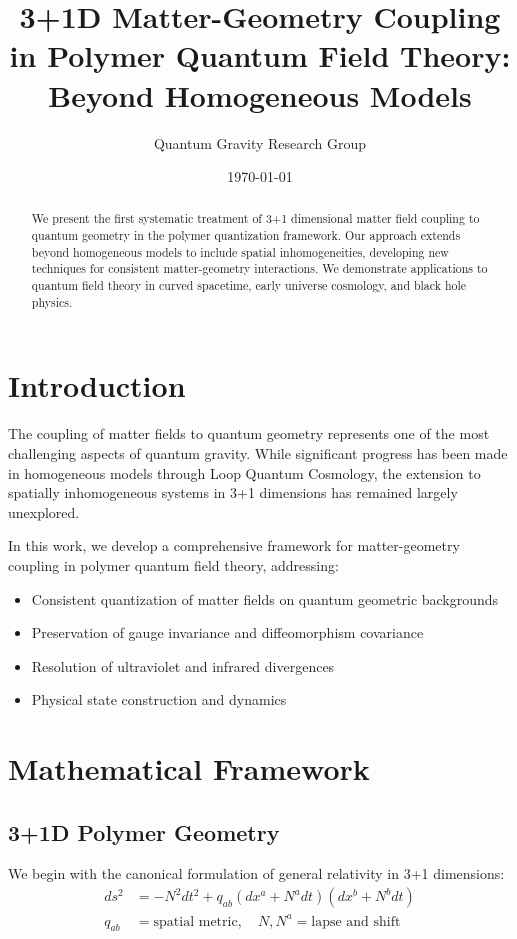\documentclass[11pt]{article}
\title{3+1D Matter-Geometry Coupling in Polymer Quantum Field Theory: Beyond Homogeneous Models}
\author{Quantum Gravity Research Group}
\date{\today}
\begin{document}
\maketitle

\begin{abstract}
We present the first systematic treatment of 3+1 dimensional matter field coupling to quantum geometry in the polymer quantization framework. Our approach extends beyond homogeneous models to include spatial inhomogeneities, developing new techniques for consistent matter-geometry interactions. We demonstrate applications to quantum field theory in curved spacetime, early universe cosmology, and black hole physics.
\end{abstract}

\section{Introduction}

The coupling of matter fields to quantum geometry represents one of the most challenging aspects of quantum gravity. While significant progress has been made in homogeneous models through Loop Quantum Cosmology, the extension to spatially inhomogeneous systems in 3+1 dimensions has remained largely unexplored.

In this work, we develop a comprehensive framework for matter-geometry coupling in polymer quantum field theory, addressing:
\begin{itemize}
\item Consistent quantization of matter fields on quantum geometric backgrounds
\item Preservation of gauge invariance and diffeomorphism covariance
\item Resolution of ultraviolet and infrared divergences
\item Physical state construction and dynamics
\end{itemize}

\section{Mathematical Framework}

\subsection{3+1D Polymer Geometry}

We begin with the canonical formulation of general relativity in 3+1 dimensions:
\begin{align}
ds^2 &= -N^2 dt^2 + q_{ab}(dx^a + N^a dt)(dx^b + N^b dt) \\
q_{ab} &= \text{spatial metric}, \quad N, N^a = \text{lapse and shift}
\end{align}
\end{document}

